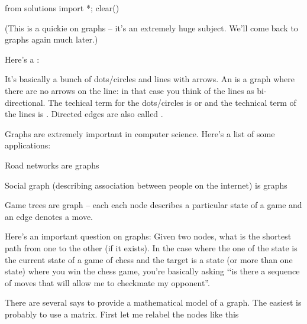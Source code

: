 \begin{python0}
from solutions import *; clear()
\end{python0}
 
(This is a quickie on graphs -- it's an extremely huge subject.
We'll come back to graphs again much later.)

Here's a :



It's basically a bunch of dots/circles and lines with arrows.
An  is a graph where there are no arrows
on the line: in that case you think of the lines as bi-directional.
The techical term for the dots/circles is  or 
and the technical term of the lines is .
Directed edges are also called .

Graphs are extremely important in computer science.
Here's a list of some applications:
\begin{myenum}
  \item Road networks are graphs
  \item Social graph (describing association between people on the internet)
  is graphs
  \item Game trees are graph -- each each node describes a particular
  state of a game and an edge denotes a move.
\end{myenum}
Here's an important question on graphs: Given two nodes, what is the
shortest path from one to the other (if it exists).
In the case where the one of the state is the current state of a game of
chess and the target is a state (or more than one state) where you win
the chess game, you're basically asking \lq\lq is there a sequence
of moves that will allow me to checkmate my opponent''.

There are several says to
provide a mathematical model of a graph.
The easiest is probably to use a matrix.
First let me relabel the nodes like this


